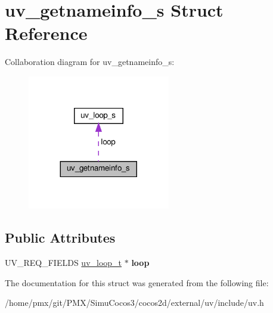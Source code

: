 \hypertarget{structuv__getnameinfo__s}{}\section{uv\+\_\+getnameinfo\+\_\+s Struct Reference}
\label{structuv__getnameinfo__s}


Collaboration diagram for uv\+\_\+getnameinfo\+\_\+s\+:
\nopagebreak
\begin{figure}[H]
\begin{center}
\leavevmode
\includegraphics[width=176pt]{structuv__getnameinfo__s__coll__graph}
\end{center}
\end{figure}
\subsection*{Public Attributes}
\begin{DoxyCompactItemize}
\item 
\mbox{\label{structuv__getnameinfo__s_a327155fae7cdf7674292f6112bc06984}} 
U\+V\+\_\+\+R\+E\+Q\+\_\+\+F\+I\+E\+L\+DS \hyperlink{structuv__loop__s}{uv\+\_\+loop\+\_\+t} $\ast$ {\bfseries loop}
\end{DoxyCompactItemize}


The documentation for this struct was generated from the following file\+:\begin{DoxyCompactItemize}
\item 
/home/pmx/git/\+P\+M\+X/\+Simu\+Cocos3/cocos2d/external/uv/include/uv.\+h\end{DoxyCompactItemize}
